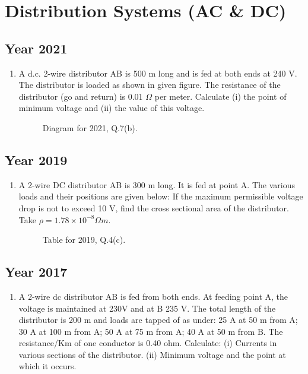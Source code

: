 \documentclass[12pt, a4paper]{article}
\begin{document}
	
	\section{Distribution Systems (AC \& DC)}
	\subsection{Year 2021}
	\begin{enumerate}[label=\textbf{Q7(b).}, wide, labelindent=0pt]
		\item A d.c. 2-wire distributor AB is 500 m long and is fed at both ends at 240 V. The distributor is loaded as shown in given figure. The resistance of the distributor (go and return) is 0.01 $\Omega$ per meter. Calculate (i) the point of minimum voltage and (ii) the value of this voltage.
		\begin{figure}[h!]
			\centering
			\caption{Diagram for 2021, Q.7(b).}
		\end{figure}
	\end{enumerate}
	
	\subsection{Year 2019}
	\begin{enumerate}[label=\textbf{Q4(c).}, wide, labelindent=0pt]
		\item A 2-wire DC distributor AB is 300 m long. It is fed at point A. The various loads and their positions are given below: If the maximum permissible voltage drop is not to exceed 10 V, find the cross sectional area of the distributor. Take $\rho = 1.78\times 10^{-8} \Omega m$.
		\begin{figure}[h!]
			\centering
			\caption{Table for 2019, Q.4(c).}
		\end{figure}
	\end{enumerate}
	
	\subsection{Year 2017}
	\begin{enumerate}[label=\textbf{Q5(c).}, wide, labelindent=0pt]
		\item A 2-wire dc distributor AB is fed from both ends. At feeding point A, the voltage is maintained at 230V and at B 235 V. The total length of the distributor is 200 m and loads are tapped of as under: 25 A at 50 m from A; 30 A at 100 m from A; 50 A at 75 m from A; 40 A at 50 m from B. The resistance/Km of one conductor is 0.40 ohm. Calculate: (i) Currents in various sections of the distributor. (ii) Minimum voltage and the point at which it occurs.
	\end{enumerate}
	
\end{document}
